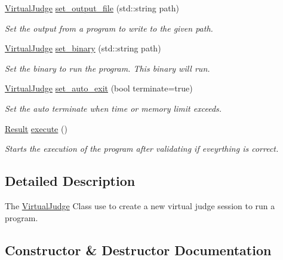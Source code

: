 \begin{DoxyCompactItemize}
\mbox{\hyperlink{classtestcaser_1_1integrator_1_1VirtualJudge}{Virtual\+Judge}} \mbox{\hyperlink{classtestcaser_1_1integrator_1_1VirtualJudge_a9f054aac69019e5f6bde646ccc72effb}{set\+\_\+output\+\_\+file}} (std\+::string path)
\begin{DoxyCompactList}\small\item\em Set the output from a program to write to the given path. \end{DoxyCompactList}\item 
\mbox{\hyperlink{classtestcaser_1_1integrator_1_1VirtualJudge}{Virtual\+Judge}} \mbox{\hyperlink{classtestcaser_1_1integrator_1_1VirtualJudge_ae9fc3d7bf1bf75fc1ec695fe831d16b6}{set\+\_\+binary}} (std\+::string path)
\begin{DoxyCompactList}\small\item\em Set the binary to run the program. This binary will run. \end{DoxyCompactList}\item 
\mbox{\hyperlink{classtestcaser_1_1integrator_1_1VirtualJudge}{Virtual\+Judge}} \mbox{\hyperlink{classtestcaser_1_1integrator_1_1VirtualJudge_a9160dd070c63084495fe6d29cab58cb4}{set\+\_\+auto\+\_\+exit}} (bool terminate=true)
\begin{DoxyCompactList}\small\item\em Set the auto terminate when time or memory limit exceeds. \end{DoxyCompactList}\item 
\mbox{\hyperlink{classtestcaser_1_1integrator_1_1Result}{Result}} \mbox{\hyperlink{classtestcaser_1_1integrator_1_1VirtualJudge_ab50e9c4506fba192fd44fce0f2a21744}{execute}} ()
\begin{DoxyCompactList}\small\item\em Starts the execution of the program after validating if eveyrthing is correct. \end{DoxyCompactList}\end{DoxyCompactItemize}


\subsection{Detailed Description}
The \mbox{\hyperlink{classtestcaser_1_1integrator_1_1VirtualJudge}{Virtual\+Judge}} Class use to create a new virtual judge session to run a program. 



\subsection{Constructor \& Destructor Documentation}
\mbox{\label{classtestcaser_1_1integrator_1_1VirtualJudge_a10b68744cc523bcc8abe1ddca7a281dc}} 
